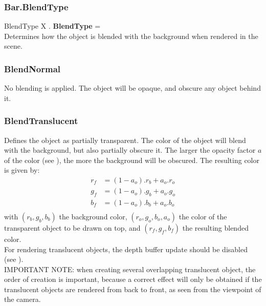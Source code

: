 \subsubsection{Bar.BlendType \label{F:Bar:BlendType}}
BlendType X . \textbf{BlendType} = \\
Determines how the object is blended with the background when rendered in the scene.

\subsubsection{BlendNormal \label{T:BlendType|BlendNormal}}
No blending is applied. The object will be opaque, and obscure any object behind it.

\subsubsection{BlendTranslucent \label{T:BlendType|BlendTranslucent}}
Defines the object as partially transparent. The color of the object will blend with the background, but also partially obscure it. The larger the opacity factor $a$ of the color (see ), the more the background will be obscured. The resulting color is given by:
\begin{equation}
\begin{array}{rcl}
r_f & = (1-a_o) . r_b + a_o . r_o \\
g_f & = (1-a_o) . g_b + a_o . g_o \\
b_f & = (1-a_o) . b_b + a_o . b_o \\
\end{array}
\end{equation}
with $(r_b,g_b,b_b)$ the background color, $(r_o,g_o,b_o,a_o)$ the color of the transparent object to be drawn on top, and $(r_f,g_f,b_f)$ the resulting blended color. \\
For rendering translucent objects, the depth buffer update should be disabled (see ). \\
IMPORTANT NOTE: when creating several overlapping translucent object, the order of creation is important, because a correct effect will only be obtained if the translucent objects are rendered from back to front, as seen from the viewpoint of the camera.

